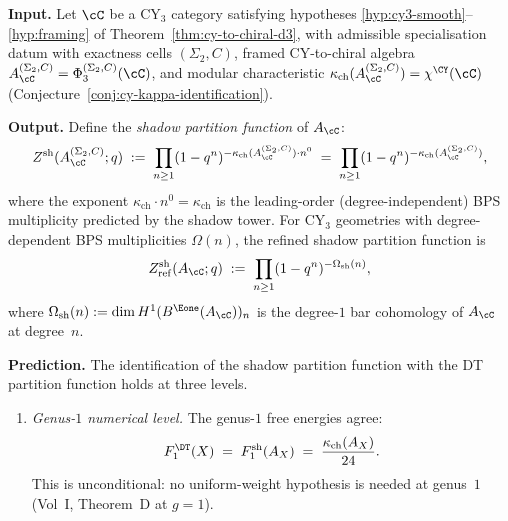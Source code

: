 \begin{conjecture}
\label{conj:shadow-bps-dt}
\ClaimStatusConjectured
\medskip\noindent\textbf{Input.}
Let $\cC$ be a CY$_3$ category satisfying hypotheses \ref{hyp:cy3-smooth}--\ref{hyp:framing} of Theorem~\textup{\ref{thm:cy-to-chiral-d3}}, with admissible specialisation datum with exactness cells $(\Sigma_2,C)$, framed CY-to-chiral algebra $A_\cC^{(\Sigma_2,C)} = \Phi_3^{(\Sigma_2,C)}(\cC)$, and modular characteristic $\kappa_{\mathrm{ch}}(A_\cC^{(\Sigma_2,C)}) = \chi^{\CY}(\cC)$ \textup{(}Conjecture~\textup{\ref{conj:cy-kappa-identification}}\textup{)}.

\medskip\noindent\textbf{Output.}
Define the \emph{shadow partition function} of $A_\cC$:
\begin{equation}
\label{eq:v3-shadow-partition-function}
 Z^{\mathrm{sh}}(A_\cC^{(\Sigma_2,C)}; q) \;:=\; \prod_{n \geq 1} (1 - q^n)^{-\kappa_{\mathrm{ch}}(A_\cC^{(\Sigma_2,C)}) \cdot n^0}
 \;=\; \prod_{n \geq 1} (1 - q^n)^{-\kappa_{\mathrm{ch}}(A_\cC^{(\Sigma_2,C)})},
\end{equation}
where the exponent $\kappa_{\mathrm{ch}} \cdot n^0 = \kappa_{\mathrm{ch}}$ is the leading-order (degree-independent) BPS multiplicity predicted by the shadow tower. For CY$_3$ geometries with degree-dependent BPS multiplicities $\Omega(n)$, the refined shadow partition function is
\begin{equation}
\label{eq:shadow-partition-refined}
 Z^{\mathrm{sh}}_{\mathrm{ref}}(A_\cC; q) \;:=\; \prod_{n \geq 1} (1 - q^n)^{-\Omega_{\mathrm{sh}}(n)},
\end{equation}
where $\Omega_{\mathrm{sh}}(n) := \dim H^1(B^{\Eone}(A_\cC))_n$ is the degree-$1$ bar cohomology of $A_\cC$ at degree~$n$.

\medskip\noindent\textbf{Prediction.}
The identification of the shadow partition function with the DT partition function holds at three levels.

\begin{enumerate}[label=\textup{(L\arabic*)}]

\item\label{level:genus1} \emph{Genus-$1$ numerical level.} The genus-$1$ free energies agree:
\begin{equation}
\label{eq:shadow-dt-genus1}
 F_1^{\DT}(X) \;=\; F_1^{\mathrm{sh}}(A_X) \;=\; \frac{\kappa_{\mathrm{ch}}(A_X)}{24}.
\end{equation}
This is unconditional: no uniform-weight hypothesis is needed at genus~$1$ (Vol~I, Theorem~D at $g = 1$).


\end{enumerate}
\end{conjecture}
